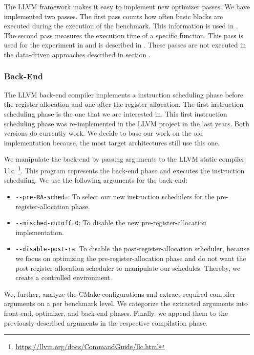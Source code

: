 The LLVM framework makes it easy to implement new optimizer passes.
We have implemented two passes.
The first pass counts how often basic blocks are executed during the execution of the benchmark.
This information is used in .
The second pass measures the execution time of a specific function.
This pass is used for the experiment in  and is described in .
These passes are not executed in the data-driven approaches described in section .

\subsubsection{Back-End}
The LLVM back-end compiler implements a instruction scheduling phase before the register allocation and one after the register allocation.
The first instruction scheduling phase is the one that we are interested in.
This first instruction scheduling phase was re-implemented in the LLVM project in the last years.
Both versions do currently work.
We decide to base our work on the old implementation because, the most target architectures still use this one.

We manipulate the back-end by passing arguments to the LLVM static compiler \lstinline{llc}~\footnote{\url{https://llvm.org/docs/CommandGuide/llc.html}}.
This program represents the back-end phase and executes the instruction scheduling.
We use the following arguments for the back-end:
\begin{itemize}
    \item \lstinline{--pre-RA-sched=}: To select our new instruction schedulers for the pre-register-allocation phase.
    \item \lstinline{--misched-cutoff=0}: To disable the new pre-register-allocation implementation.
    \item \lstinline{--disable-post-ra}: To disable the post-register-allocation scheduler, because we focus on optimizing the pre-register-allocation phase and do not want the post-register-allocation scheduler to manipulate our schedules. Thereby, we create a controlled environment.
\end{itemize}

We, further, analyze the CMake configurations and extract required compiler arguments on a per benchmark level.
We categorize the extracted arguments into front-end, optimizer, and back-end phases.
Finally, we append them to the previously described arguments in the respective compilation phase.

